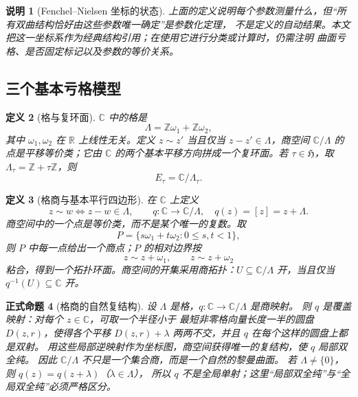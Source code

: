 \documentclass[UTF8,fontset=none,a4paper,11pt]{ctexart}
\theoremstyle{foundation-definition}
\newtheorem{definition}{定义}[section]
\theoremstyle{foundation-theorem}
\theoremstyle{foundation-proposition}
\newtheorem{proposition}[definition]{正式命题}
\theoremstyle{foundation-example}
\theoremstyle{foundation-remark}
\newtheorem{remark}[definition]{说明}
\theoremstyle{foundation-theorem}
\begin{document}
\begin{remark}[Fenchel--Nielsen 坐标的状态]
上面的定义说明每个参数测量什么，但“所有双曲结构恰好由这些参数唯一确定”是参数化定理，
不是定义的自动结果。本文把这一坐标系作为经典结构引用；在使用它进行分类或计算时，仍需注明
曲面亏格、是否固定标记以及参数的等价关系。
\end{remark}

\subsection{三个基本亏格模型}

\begin{definition}[格与复环面]\label{def:lattice-torus}
\(\mathbb C\) 中的格是
\[
\Lambda=\mathbb Z\omega_1+\mathbb Z\omega_2,
\]
其中 \(\omega_1,\omega_2\) 在 \(\mathbb R\) 上线性无关。定义 \(z\sim z'\) 当且仅当 \(z-z'\in\Lambda\)，商空间 \(\mathbb C/\Lambda\) 的点是平移等价类；它由 \(\mathbb C\) 的两个基本平移方向拼成一个复环面。若 \(\tau\in\mathfrak H\)，取 \(\Lambda_\tau=\mathbb Z+\tau\mathbb Z\)，则
\[
E_\tau=\mathbb C/\Lambda_\tau.
\]
\end{definition}

\begin{definition}[格商与基本平行四边形]\label{def:lattice-quotient-parallelogram}
在 \(\mathbb C\) 上定义
\[
z\sim w\Longleftrightarrow z-w\in\Lambda,
\qquad
q:\mathbb C\to\mathbb C/\Lambda,\quad q(z)=[z]=z+\Lambda.
\]
商空间中的一个点是等价类，而不是某个唯一的复数。取
\[
P=\{s\omega_1+t\omega_2:0\leq s,t<1\},
\]
则 \(P\) 中每一点给出一个商点；\(P\) 的相对边界按
\[
z\sim z+\omega_1,\qquad z\sim z+\omega_2
\]
粘合，得到一个拓扑环面。商空间的开集采用商拓扑：\(U\subseteq\mathbb C/\Lambda\)
开，当且仅当 \(q^{-1}(U)\subseteq\mathbb C\) 开。
\end{definition}

\begin{proposition}[格商的自然复结构]
设 \(\Lambda\) 是格，\(q:\mathbb C\to\mathbb C/\Lambda\) 是商映射。
则 \(q\) 是覆盖映射：对每个 \(z\in\mathbb C\)，可取一个半径小于
最短非零格向量长度一半的圆盘 \(D(z,r)\)，使得各个平移
\(D(z,r)+\lambda\) 两两不交，并且 \(q\) 在每个这样的圆盘上都是双射。
用这些局部逆映射作为坐标图，商空间获得唯一的复结构，使 \(q\) 局部双全纯。
因此 \(\mathbb C/\Lambda\) 不只是一个集合商，而是一个自然的黎曼曲面。
若 \(\Lambda\ne\{0\}\)，则 \(q(z)=q(z+\lambda)\)（\(\lambda\in\Lambda\)），
所以 \(q\) 不是全局单射；这里“局部双全纯”与“全局双全纯”必须严格区分。
\end{proposition}
\end{document}
